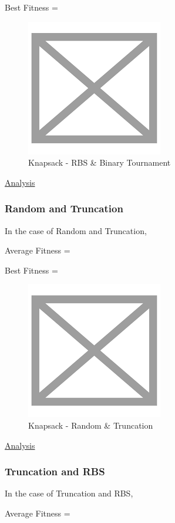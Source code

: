 \documentclass[11pt, letterpaper]{article}
\begin{document}
Best Fitness = 
\begin{figure}[H]
    \centering
    \includegraphics[scale = 0.6]{images/placeHolder.png}
    \caption {Knapsack - RBS \& Binary Tournament}
    \label {fig:tpsRB}
\end{figure}

\underline{Analysis}
\subsubsection {Random and Truncation}
In the case of Random and Truncation,

Average Fitness = 

Best Fitness = 
\begin{figure}[H]
    \centering
    \includegraphics[scale = 0.6]{images/placeHolder.png}
    \caption {Knapsack - Random \& Truncation}
    \label {fig:tpsRT}
\end{figure}

\underline{Analysis}
\subsubsection {Truncation and RBS}
In the case of Truncation and RBS,

Average Fitness = 
\end{document}
